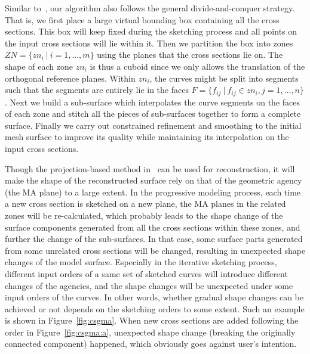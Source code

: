 Similar to~\cite{LBDLJ08}, our algorithm also  follows the general
divide-and-conquer strategy. That is, we first place a large virtual
bounding box containing all the cross sections. This box will keep
fixed during the sketching process and all points on the input cross
sections will lie within it. Then we partition the box into zones
$ZN=\{zn_i~|~i=1,...,m\}$ using the planes that the cross sections
lie on. The shape of each zone $zn_i$ is thus a cuboid since we only
allows the translation of the orthogonal reference planes. Within
$zn_i$, the curves might be split into segments such that the segments
are entirely lie in the faces $F=\{f_{ij}~|~f_{ij}\in
zn_i,j=1,...,n\}$. Next we build a sub-surface which interpolates
the curve segments on the faces of each zone and stitch all the
pieces of sub-surfaces together to form a complete surface. Finally
we carry out constrained refinement and smoothing to the initial
mesh surface to improve its quality while maintaining its
interpolation on the input cross sections.

Though the projection-based method in~\cite{LBDLJ08} can be used for
reconstruction, it will make the shape of the reconstructed surface
rely on that of the geometric agency (the MA plane) to a large
extent. In the progressive modeling process, each time a new cross
section is sketched on a new plane, the MA planes in the related
zones will be re-calculated, which probably leads to the shape
change of the surface components generated from all the cross
sections within these zones, and further the change of the
sub-surfaces. In that case, some surface parts generated from some
unrelated cross sections will be changed, resulting in unexpected
shape changes of the model surface. Especially in the iterative
sketching process, different input orders of a same set of sketched
curves will introduce different changes of the agencies, and the
shape changes will be unexpected under some input orders of the
curves. In other words, whether gradual shape changes can be
achieved or not depends on the sketching orders to some extent. Such
an example is shown in Figure~\ref{fig:csgma}. When new cross
sections are added following the order in Figure~\ref{fig:csgma:a},
unexpected shape change (breaking the originally connected
component) happened, which obviously goes against user's intention.


